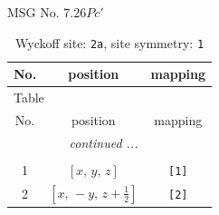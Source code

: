 \documentclass[fleqn,8pt]{jsarticle}
\begin{document}
\setcounter{MaxMatrixCols}{32}

\renewcommand{\tablename}{Table~}
\renewcommand{\figurename}{Figure~}
\begin{center}
\LARGE
MSG No. 7.26\quad$Pc'$
\end{center}
\renewcommand{\arraystretch}{1.2}
\begin{longtable}{ccc}
\caption{Wyckoff site: {\tt 2a}, site symmetry: {\tt 1}}
 \\
 \hline \hline
No. & position & mapping \\ \hline \endfirsthead

\multicolumn{2}{l}{\tablename\ \thetable{}} \\
 \hline \hline
No. & position & mapping \\ \hline \endhead

 \hline \hline
\multicolumn{2}{r}{\footnotesize\it continued ...} \\ \endfoot

 \hline \hline
\multicolumn{2}{r}{} \\ \endlastfoot

1 & $\left[ x,\, y,\, z \right]$ & {\tt [1]} \\ \hline
2 & $\left[ x,\, - y,\, z + \frac{1}{2} \right]$ & {\tt [2]} \\
\end{longtable}
\end{document}

